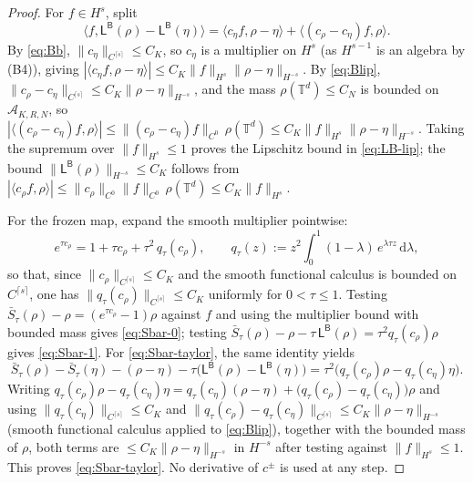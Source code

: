 \documentclass[a4paper,fleqn]{cas-sc}
\theoremstyle{definition}
\theoremstyle{remark}
\begin{document}
\begin{proof}
For $f\in H^s$, split
\[
\langle f,\mathsf L^{\mathsf B}(\rho)-\mathsf L^{\mathsf B}(\eta)\rangle
=\langle c_\eta f,\rho-\eta\rangle+\langle (c_\rho-c_\eta)f,\rho\rangle .
\]
By \eqref{eq:Bb}, $\|c_\eta\|_{C^{\lceil s\rceil}}\le C_K$, so $c_\eta$ is a
multiplier on $H^s$ (as $H^{s-1}$ is an algebra by (B4)), giving
$|\langle c_\eta f,\rho-\eta\rangle|\le C_K\|f\|_{H^s}\|\rho-\eta\|_{H^{-s}}$. By
\eqref{eq:Blip}, $\|c_\rho-c_\eta\|_{C^{\lceil s\rceil}}\le C_K\|\rho-\eta\|_{H^{-s}}$,
and the mass $\rho(\mathbb T^d)\le C_N$ is bounded on $\mathcal A_{K,R,N}$, so
$|\langle (c_\rho-c_\eta)f,\rho\rangle|\le\|(c_\rho-c_\eta)f\|_{C^0}\,\rho(\mathbb T^d)
\le C_K\|f\|_{H^s}\|\rho-\eta\|_{H^{-s}}$. Taking the supremum over $\|f\|_{H^s}\le1$
proves the Lipschitz bound in \eqref{eq:LB-lip}; the bound
$\|\mathsf L^{\mathsf B}(\rho)\|_{H^{-s}}\le C_K$ follows from
$|\langle c_\rho f,\rho\rangle|\le\|c_\rho\|_{C^0}\|f\|_{C^0}\,\rho(\mathbb T^d)\le C_K\|f\|_{H^s}$.

For the frozen map, expand the smooth multiplier pointwise:
\[
e^{\tau c_\rho}=1+\tau c_\rho+\tau^2\,q_\tau(c_\rho),
\qquad
q_\tau(z):=z^2\!\int_0^1(1-\lambda)\,e^{\lambda\tau z}\,\mathrm d\lambda,
\]
so that, since $\|c_\rho\|_{C^{\lceil s\rceil}}\le C_K$ and the smooth functional
calculus is bounded on $C^{\lceil s\rceil}$, one has
$\|q_\tau(c_\rho)\|_{C^{\lceil s\rceil}}\le C_K$ uniformly for $0<\tau\le1$. Testing
$\bar S_\tau(\rho)-\rho=(e^{\tau c_\rho}-1)\rho$ against $f$ and using the multiplier
bound with bounded mass gives \eqref{eq:Sbar-0}; testing
$\bar S_\tau(\rho)-\rho-\tau\,\mathsf L^{\mathsf B}(\rho)=\tau^2 q_\tau(c_\rho)\rho$
gives \eqref{eq:Sbar-1}. For \eqref{eq:Sbar-taylor}, the same identity yields
\[
\bar S_\tau(\rho)-\bar S_\tau(\eta)-(\rho-\eta)
-\tau\bigl(\mathsf L^{\mathsf B}(\rho)-\mathsf L^{\mathsf B}(\eta)\bigr)
=\tau^2\bigl(q_\tau(c_\rho)\rho-q_\tau(c_\eta)\eta\bigr).
\]
Writing $q_\tau(c_\rho)\rho-q_\tau(c_\eta)\eta
=q_\tau(c_\eta)(\rho-\eta)+\bigl(q_\tau(c_\rho)-q_\tau(c_\eta)\bigr)\rho$ and using
$\|q_\tau(c_\eta)\|_{C^{\lceil s\rceil}}\le C_K$ and
$\|q_\tau(c_\rho)-q_\tau(c_\eta)\|_{C^{\lceil s\rceil}}\le C_K\|\rho-\eta\|_{H^{-s}}$
(smooth functional calculus applied to \eqref{eq:Blip}), together with the bounded
mass of $\rho$, both terms are $\le C_K\|\rho-\eta\|_{H^{-s}}$ in $H^{-s}$ after
testing against $\|f\|_{H^s}\le1$. This proves \eqref{eq:Sbar-taylor}. No derivative
of $c^\pm$ is used at any step.
\end{proof}
\end{document}
